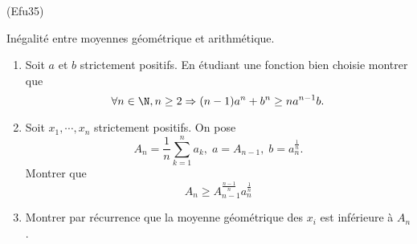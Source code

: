 \begin{tiny}(Efu35)\end{tiny} Inégalité entre moyennes géométrique et arithmétique.
\begin{enumerate}
 \item Soit $a$ et $b$ strictement positifs. En étudiant une fonction bien choisie montrer que 
\[
 \forall n \in \N, n\geq 2 \Rightarrow (n-1)a^n + b^n \geq na^{n-1}b.
\]
 \item Soit $x_1, \cdots, x_n$ strictement positifs. On pose
\[
 A_n = \frac{1}{n}\sum_{k=1}^na_k, \; a = A_{n-1},\; b = a_n^{\frac{1}{n}}.
\]
Montrer que
\[
 A_n \geq A_{n-1}^{\frac{n-1}{n}}a_n^{\frac{1}{n}}
\]
\item Montrer par récurrence que la moyenne géométrique des $x_i$ est inférieure à $A_n$.
\end{enumerate}
